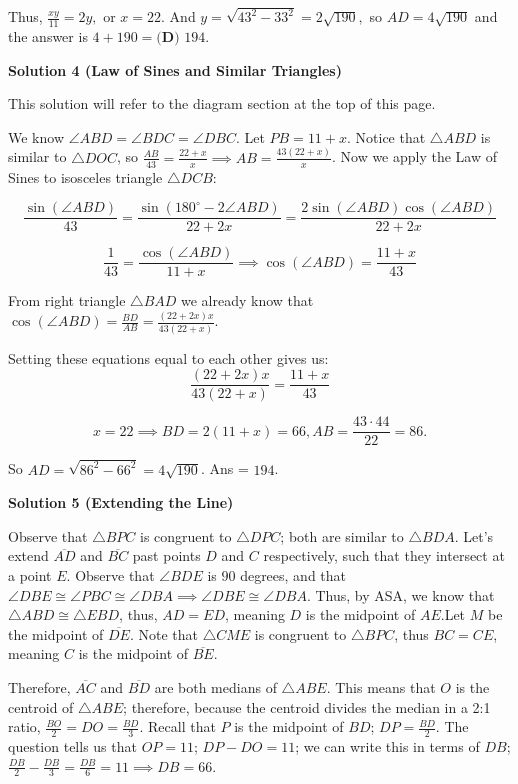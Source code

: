 \begin{enumerate}
 Thus, $\frac{xy}{11} = 2y,$ or $x = 22.$ And $y = \sqrt{43^2 - 33^2} = 2 \sqrt{190},$ so $AD = 4 \sqrt{190}$ and the answer is $4+190=\boxed{\textbf{(D) }194}.$




\textbf{Solution 4 (Law of Sines and Similar Triangles)}

This solution will refer to the diagram section at the top of this page.

 
We know $\angle ABD = \angle BDC = \angle DBC$. Let $PB = 11 + x$. Notice that $\triangle ABD$ is similar to $\triangle DOC$, so $\frac{AB}{43} = \frac{22 + x}{x} \implies AB = \frac{43(22 + x)}{x}$. Now we apply the Law of Sines to isosceles triangle $\triangle DCB$:

 
 \[\frac{\sin(\angle ABD)}{43} = \frac{\sin(180^\circ - 2\angle ABD)}{22 + 2x} = \frac{2\sin(\angle ABD)\cos(\angle ABD)}{22 + 2x}\]

 \[\frac{1}{43} = \frac{\cos(\angle ABD)}{11 + x} \implies \cos(\angle ABD) = \frac{11 + x}{43}\]

 From right triangle $\triangle BAD$ we already know that $\cos(\angle ABD) = \frac{BD}{AB} = \frac{(22 + 2x)x}{43(22 + x)}$.

 Setting these equations equal to each other gives us:
 \[\frac{(22 + 2x)x}{43(22 + x)} = \frac{11 + x}{43}\]

 \[x = 22 \implies BD = 2(11 + x) = 66, AB = \frac{43 \cdot 44}{22} = 86.\]

 So $AD = \sqrt{86^2 - 66^2} = 4\sqrt{190}$. Ans = $\boxed{194}$.

 



\textbf{Solution 5 (Extending the Line)}

Observe that $\triangle BPC$ is congruent to $\triangle DPC$; both are similar to $\triangle BDA$. Let's extend $\overline{AD}$ and $\overline{BC}$ past points $D$ and $C$ respectively, such that they intersect at a point $E$. Observe that $\angle BDE$ is $90$ degrees, and that $\angle DBE \cong \angle PBC \cong \angle DBA \implies \angle DBE \cong \angle DBA$. Thus, by ASA, we know that $\triangle ABD \cong \triangle EBD$, thus, $AD = ED$, meaning $D$ is the midpoint of $AE$.Let $M$ be the midpoint of $\overline{DE}$. Note that $\triangle CME$ is congruent to $\triangle BPC$, thus $BC = CE$, meaning $C$ is the midpoint of $\overline{BE}.$

 Therefore, $\overline{AC}$ and $\overline{BD}$ are both medians of $\triangle ABE$. This means that $O$ is the centroid of $\triangle ABE$; therefore, because the centroid divides the median in a 2:1 ratio, $\frac{BO}{2} = DO = \frac{BD}{3}$. Recall that $P$ is the midpoint of $BD$; $DP = \frac{BD}{2}$. The question tells us that $OP = 11$; $DP-DO=11$; we can write this in terms of $DB$; $\frac{DB}{2}-\frac{DB}{3} = \frac{DB}{6} = 11 \implies DB = 66$.


\end{enumerate}
